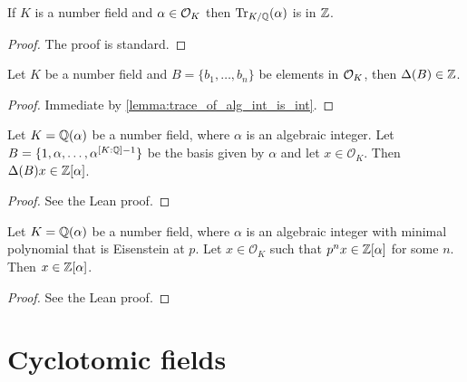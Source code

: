 \begin{lemma}\label{lemma:trace_of_alg_int_is_int}
	\leanok
	If $K$ is a number field and $\alpha \in \mathcal{O}_K$ then $\operatorname{Tr}_{K/\mathbb{Q}}(\alpha)$ is in $\mathbb{Z}$.
\end{lemma}
\begin{proof}
  \leanok
  The proof is standard.
\end{proof}

\begin{lemma}\label{lemma:int_basis_int_disc}
    \leanok
	Let $K$ be a number field and $B=\{b_1,\dots,b_n\}$ be elements in $\mathcal{O}_K$, then $\Delta(B) \in \mathbb{Z}$.
\end{lemma}
\begin{proof}
    \leanok
    Immediate by \ref{lemma:trace_of_alg_int_is_int}.
\end{proof}


\begin{lemma}\label{lemma:disc_int_basis}
	\leanok
	Let $K = \mathbb{Q}(\alpha)$ be a number field, where $\alpha$ is an algebraic integer. Let $B = \{1, \alpha, \ldots, \alpha^{[K : \mathbb{Q}] - 1} \}$ be the basis given by $\alpha$ and let $x \in \mathcal{O}_K$. Then $\Delta(B)x \in \mathbb{Z}[\alpha]$.
\end{lemma}

\begin{proof}
    \leanok
    See the Lean proof.
\end{proof}

\begin{lemma}\label{lemma:eis_crit_and_alg_ints}
	\leanok
	Let $K = \mathbb{Q}(\alpha)$ be a number field, where $\alpha$ is an algebraic integer with minimal polynomial that is Eisenstein at $p$. Let $x \in \mathcal{O}_K$ such that $p^n x \in \mathbb{Z}[\alpha]$ for some $n$. Then $x \in \mathbb{Z}[\alpha]$.
\end{lemma}
\begin{proof}
    \leanok
    See the Lean proof.
\end{proof}

\section{Cyclotomic fields}

